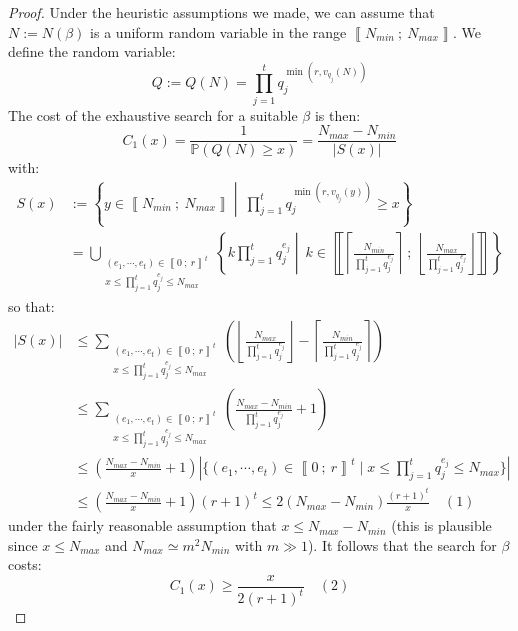 \documentclass[a4paper,10pt]{report}
\theoremstyle{definition}
\theoremstyle{plain}
\theoremstyle{definition}
\renewcommand{\i}[2]{\left\llbracket #1~;~#2\right\rrbracket}
\renewcommand{\(}{\left(}
\renewcommand{\)}{\right)}
\renewcommand{\P}{\mathbb{P}}
\begin{document}
\begin{proof}
Under the heuristic assumptions we made, we can assume that $N:=N(\beta)$ is a uniform random variable in the range $\i{N_{min}}{N_{max}}$.  We define the random variable:
\[Q:=Q(N)=\prod_{j=1}^t q_j^{\min(r,v_{q_j}(N))}\]
The cost of the exhaustive search for a suitable $\beta$ is then:
\[C_1(x)=\frac{1}{\P(Q(N)\geq x)}=\frac{N_{max}-N_{min}}{|S(x)|}\]
with:
\begin{align*}S(x)&:=\left\{y\in\i{N_{min}}{N_{max}}\middle | \ \prod_{j=1}^t q_j^{\min(r,v_{q_j}(y))}\geq x\right\}\\
&=\bigcup_{\substack{(e_1, \cdots, e_t)\in\i{0}{r}^t\\x\leq \prod_{j=1}^t q_j^{e_j}\leq N_{max}}}\left\{k\prod_{j=1}^t q_j^{e_j}\middle | \ k\in\i{\left\lceil\frac{N_{min}}{\prod_{j=1}^t q_j^{e_j}}\right\rceil}{\left\lfloor\frac{N_{max}}{\prod_{j=1}^t q_j^{e_j}}\right\rfloor}\right\}
\end{align*}
so that:
\begin{align*}
|S(x)|&\leq \sum_{\substack{(e_1, \cdots, e_t)\in\i{0}{r}^t\\x\leq \prod_{j=1}^t q_j^{e_j}\leq N_{max}}}\(\left\lfloor\frac{N_{max}}{\prod_{j=1}^t q_j^{e_j}}\right\rfloor-\left\lceil\frac{N_{min}}{\prod_{j=1}^t q_j^{e_j}}\right\rceil\)\\
&\leq \sum_{\substack{(e_1, \cdots, e_t)\in\i{0}{r}^t\\x\leq \prod_{j=1}^t q_j^{e_j}\leq N_{max}}}\(\frac{N_{max}-N_{min}}{\prod_{j=1}^t q_j^{e_j}}+1\)\\
&\leq\(\frac{N_{max}-N_{min}}{x}+1\)|\{(e_1, \cdots, e_t)\in\i{0}{r}^t\mid x\leq \prod_{j=1}^t q_j^{e_j}\leq N_{max}\}|\\
&\leq\(\frac{N_{max}-N_{min}}{x}+1\)(r+1)^t\leq 2(N_{max}-N_{min})\frac{(r+1)^t}{x} \quad (1)
\end{align*}
under the fairly reasonable assumption that $x\leq N_{max}-N_{min}$ (this is plausible since $x\leq N_{max}$ and $N_{max}\simeq m^2 N_{min}$ with $m\gg 1$). It follows that the search for $\beta$ costs:
\[C_1(x)\geq  \frac{x}{2(r+1)^t}\quad (2)\]


\end{proof}
\end{document}
